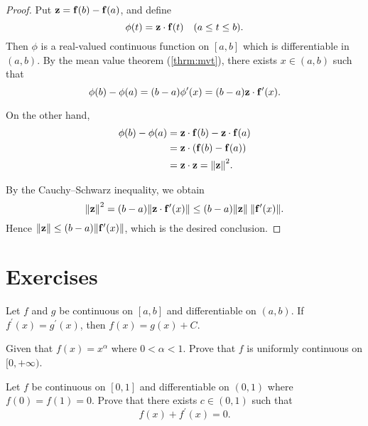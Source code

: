 \begin{proof}
Put $\vb{z}=\vb{f}(b)-\vb{f}(a)$, and define
\[\phi(t)=\vb{z}\cdot\vb{f}(t)\quad(a\le t\le b).\]
Then $\phi$ is a real-valued continuous function on $[a,b]$ which is differentiable in $(a,b)$. By the mean value theorem (\ref{thrm:mvt}), there exists $x\in(a,b)$ such that
\[\phi(b)-\phi(a)=(b-a)\phi^\prime(x)=(b-a)\vb{z}\cdot\vb{f}^\prime(x).\]

On the other hand,
\begin{align*}
\phi(b)-\phi(a)
&=\vb{z}\cdot\vb{f}(b)-\vb{z}\cdot\vb{f}(a)\\
&=\vb{z}\cdot\left(\vb{f}(b)-\vb{f}(a)\right)\\
&=\vb{z}\cdot\vb{z}=\norm{\vb{z}}^2.
\end{align*}

By the Cauchy--Schwarz inequality, we obtain
\[\norm{\vb{z}}^2=(b-a)\norm{\vb{z}\cdot\vb{f}^\prime(x)}\le(b-a)\norm{\vb{z}}\:\norm{\vb{f}^\prime(x)}.\]
Hence $\norm{\vb{z}}\le(b-a)\norm{\vb{f}^\prime(x)}$, which is the desired conclusion.
\end{proof}
\pagebreak

\section*{Exercises}
\begin{exercise}
Let $f$ and $g$ be continuous on $[a,b]$ and differentiable on $(a,b)$. If $f^\prime(x)=g^\prime(x)$, then $f(x)=g(x)+C$.
\end{exercise}

\begin{exercise}
Given that $f(x)=x^\alpha$ where $0<\alpha<1$. Prove that $f$ is uniformly continuous on $[0,+\infty)$.
\end{exercise}

\begin{exercise}
Let $f$ be continuous on $[0,1]$ and differentiable on $(0,1)$ where $f(0)=f(1)=0$. Prove that there exists $c\in(0,1)$ such that
\[ f(x)+f^\prime(x)=0. \]
\end{exercise}